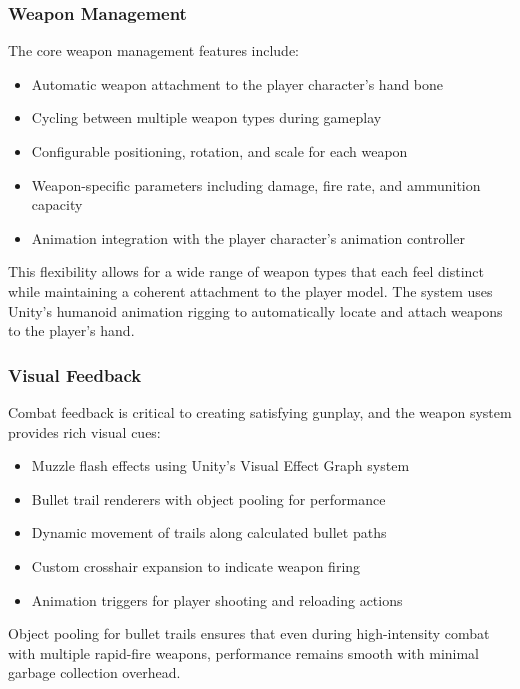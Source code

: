 \documentclass{article}
\begin{document}
    \subsubsection{Weapon Management}
    The core weapon management features include:

    \begin{itemize}
        \item Automatic weapon attachment to the player character's hand bone
        \item Cycling between multiple weapon types during gameplay
        \item Configurable positioning, rotation, and scale for each weapon
        \item Weapon-specific parameters including damage, fire rate, and ammunition capacity
        \item Animation integration with the player character's animation controller
    \end{itemize}

    This flexibility allows for a wide range of weapon types that each feel distinct while maintaining a coherent attachment to the player model. The system uses Unity's humanoid animation rigging to automatically locate and attach weapons to the player's hand.

    \subsubsection{Visual Feedback}
    Combat feedback is critical to creating satisfying gunplay, and the weapon system provides rich visual cues:

    \begin{itemize}
        \item Muzzle flash effects using Unity's Visual Effect Graph system
        \item Bullet trail renderers with object pooling for performance
        \item Dynamic movement of trails along calculated bullet paths
        \item Custom crosshair expansion to indicate weapon firing
        \item Animation triggers for player shooting and reloading actions
    \end{itemize}

    Object pooling for bullet trails ensures that even during high-intensity combat with multiple rapid-fire weapons, performance remains smooth with minimal garbage collection overhead.
\end{document}
